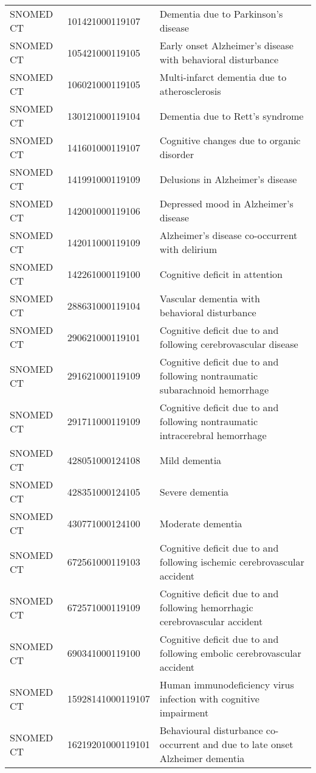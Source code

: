 \begin{longtable}{p{}p{}p{}}
  SNOMED CT & 101421000119107 & Dementia due to Parkinson's disease \\ 
  SNOMED CT & 105421000119105 & Early onset Alzheimer's disease with behavioral disturbance \\ 
  SNOMED CT & 106021000119105 & Multi-infarct dementia due to atherosclerosis \\ 
  SNOMED CT & 130121000119104 & Dementia due to Rett's syndrome \\ 
  SNOMED CT & 141601000119107 & Cognitive changes due to organic disorder \\ 
  SNOMED CT & 141991000119109 & Delusions in Alzheimer's disease \\ 
  SNOMED CT & 142001000119106 & Depressed mood in Alzheimer's disease \\ 
  SNOMED CT & 142011000119109 & Alzheimer's disease co-occurrent with delirium \\ 
  SNOMED CT & 142261000119100 & Cognitive deficit in attention \\ 
  SNOMED CT & 288631000119104 & Vascular dementia with behavioral disturbance \\ 
  SNOMED CT & 290621000119101 & Cognitive deficit due to and following cerebrovascular disease \\ 
  SNOMED CT & 291621000119109 & Cognitive deficit due to and following nontraumatic subarachnoid hemorrhage \\ 
  SNOMED CT & 291711000119109 & Cognitive deficit due to and following nontraumatic intracerebral hemorrhage \\ 
  SNOMED CT & 428051000124108 & Mild dementia \\ 
  SNOMED CT & 428351000124105 & Severe dementia \\ 
  SNOMED CT & 430771000124100 & Moderate dementia \\ 
  SNOMED CT & 672561000119103 & Cognitive deficit due to and following ischemic cerebrovascular accident \\ 
  SNOMED CT & 672571000119109 & Cognitive deficit due to and following hemorrhagic cerebrovascular accident \\ 
  SNOMED CT & 690341000119100 & Cognitive deficit due to and following embolic cerebrovascular accident \\ 
  SNOMED CT & 15928141000119107 & Human immunodeficiency virus infection with cognitive impairment \\ 
  SNOMED CT & 16219201000119101 & Behavioural disturbance co-occurrent and due to late onset Alzheimer dementia \\ 

\end{longtable}
